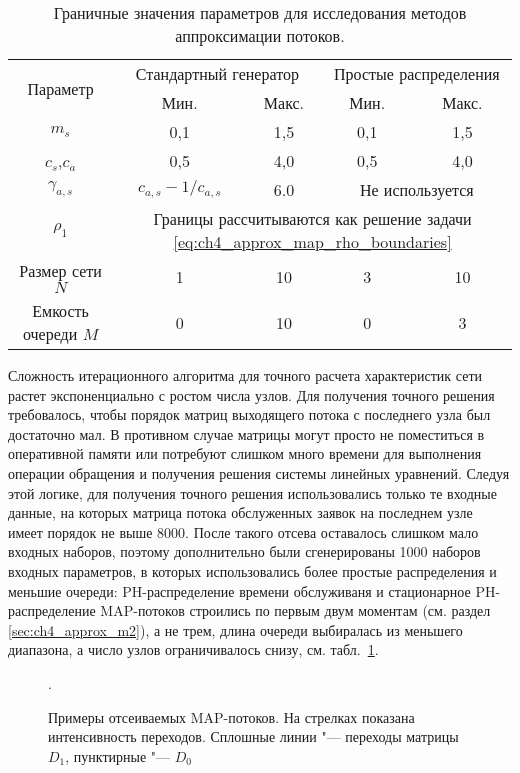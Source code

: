 \begin{table}[h]
  \centering
  \caption{\label{tab:ch4_results_approx_input_range} Граничные значения параметров для исследования методов аппроксимации потоков.}
  \begin{tabular}{|c|cc|cc|}
    \hline
    \multirow{2}{*}{Параметр}
      &\multicolumn{2}{c|}{Стандартный генератор}&\multicolumn{2}{c|}{Простые распределения}\\
                    &Мин.   &Макс.    &Мин.   &Макс.\\
      \hline
      $m_s$           &0,1       &1,5        &0,1        &1,5\\
      $c_s$,$c_a$     &0,5       &4,0        &0,5        &4,0\\
      $\gamma_{a,s}$  &$c_{a,s} - 1/c_{a,s}$ &6.0    &\multicolumn{2}{c|}{Не используется}\\
    $\rho_1$        &\multicolumn{4}{c|}{Границы рассчитываются как решение задачи
      \eqref{eq:ch4_approx_map_rho_boundaries}}\\
    Размер сети $N$ &1          &10        &3           &10\\
    Емкость очереди $M$ &0      &10        &0           &3\\
    \hline
  \end{tabular}
\end{table}


Сложность итерационного алгоритма для точного расчета характеристик сети растет экспоненциально с ростом числа узлов. Для получения точного решения требовалось, чтобы порядок матриц выходящего потока с последнего узла был достаточно мал. В противном случае матрицы могут просто не поместиться в оперативной памяти или потребуют слишком много времени для выполнения операции обращения и получения решения системы линейных уравнений. Следуя этой логике, для получения точного решения использовались только те входные данные, на которых матрица потока обслуженных заявок на последнем узле имеет порядок не выше 8000. После такого отсева оставалось слишком мало входных наборов, поэтому дополнительно были сгенерированы 1000 наборов входных параметров, в которых использовались более простые распределения и меньшие очереди: PH-распределение времени обслуживаня и стационарное PH-распределение MAP-потоков строились по первым двум моментам (см. раздел \ref{sec:ch4_approx_m2}), а не трем, длина очереди выбиралась из меньшего диапазона, а число узлов ограничивалось снизу, см. табл.~\ref{tab:ch4_results_approx_input_range}.

\begin{figure}[h]
  \caption{Примеры отсеиваемых MAP-потоков. На стрелках показана интенсивность переходов. Сплошные линии "--- переходы матрицы $D_1$, пунктирные "--- $D_0$}.\label{fig:ch4_results_bad_maps}
\end{figure}

